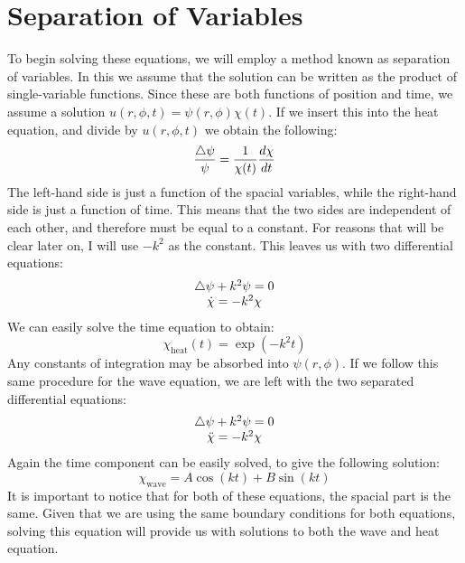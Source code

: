 \documentclass{paper}
\begin{document}
\section{Separation of Variables}
To begin solving these equations, we will employ a method known as separation of variables. In this we assume that the solution can be written as the product of single-variable functions. Since these are both functions of position and time, we assume a solution $u(r,\phi,t)=\psi(r,\phi)\chi(t)$. If we insert this into the heat equation, and divide by $u(r,\phi,t)$ we obtain the following:
\begin{equation}
  \frac{\bigtriangleup \psi}{\psi} = \frac{1}{\chi(t)}\frac{d \chi}{d t}
\end{equation}
The left-hand side is just a function of the spacial variables, while the right-hand side is just a function of time. This means that the two sides are independent of each other, and therefore must be equal to a constant. For reasons that will be clear later on, I will use $-k^2$ as the constant. This leaves us with two differential equations:
\begin{equation}
  \begin{matrix}
    \bigtriangleup\psi+k^2\psi=0\\
    \dot{\chi}=-k^2 \chi
  \end{matrix}
\end{equation}
We can easily solve the time equation to obtain:
\begin{equation}
  \chi_{\mathrm{heat}}(t)=\exp(-k^2 t)
\end{equation}
Any constants of integration may be absorbed into $\psi(r,\phi)$. If we follow this same procedure for the wave equation, we are left with the two separated differential equations:
\begin{equation}
  \begin{matrix}
    \bigtriangleup\psi+k^2\psi=0\\
    \ddot{\chi}=-k^2 \chi
  \end{matrix}
\end{equation}
Again the time component can be easily solved, to give the following solution:
\begin{equation}
  \chi_{\mathrm{wave}}=A\cos(kt)+B\sin(kt)
\end{equation}
It is important to notice that for both of these equations, the spacial part is the same. Given that we are using the same boundary conditions for both equations, solving this equation will provide us with solutions to both the wave and heat equation.
\end{document}
